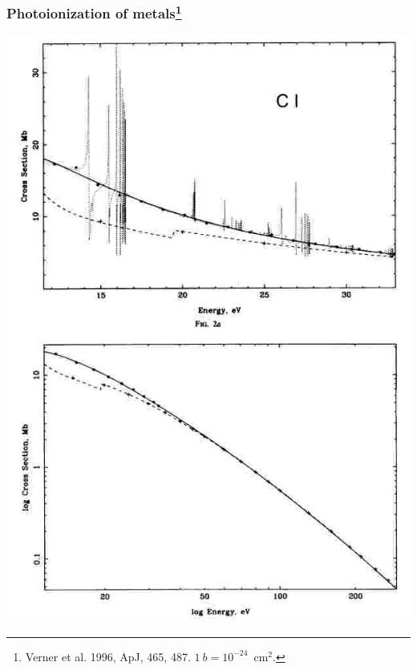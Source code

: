 \begin{frame}\frametitle{Photoionization of metals\footnote{Verner et al. 1996, ApJ, 465, 487. $1~b = 10^{-24}$~cm$^2$.}}






\begin{minipage}[t]{0.49\textwidth}
  \begin{center}
    \includegraphics[width=\textwidth,height=!]{./C/ci_photion.jpg}
  \end{center}
\end{minipage}
\begin{minipage}[t]{0.49\textwidth}
  \begin{center}

\end{center}
\end{minipage}
\end{frame}
